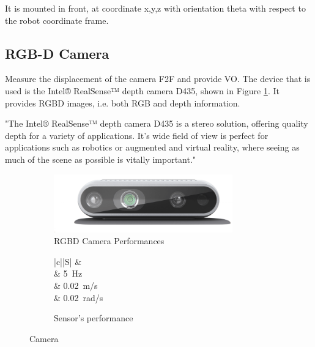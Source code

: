 It is mounted in front, at coordinate x,y,z with orientation theta with respect to the robot coordinate frame.

\subsection{RGB-D Camera}

\noindent Measure the displacement of the camera \gls{F2F} and provide \gls{VO}.
The device that is used is the Intel® RealSense™ depth camera D435, shown in Figure \ref{fig:d435}.
It provides \gls{RGBD} images, i.e. both \gls{RGB} and depth information.

"The Intel® RealSense™ depth camera D435 is a stereo solution, offering quality depth for a variety of applications. It's wide field of view is perfect for applications such as robotics or augmented and virtual reality, where seeing as much of the scene as possible is vitally important."

\begin{figure}[!ht]
	\begin{center}
		\begin{subfigure}[b]{.5\textwidth}
			\begin{center}
				\includegraphics[width=0.85\textwidth]{Images/4-Methods/d435i-1.png}
			\end{center}
			\caption{\gls{RGBD} Camera Performances}
			\label{fig:d435}
		\end{subfigure}
		\begin{subfigure}[b]{.45\textwidth}
			\begin{center}
				\label{tab:evalCamera}
				\begin{tabular}{|c||S|}
					\hline
					 &   \\
					\hline
					\hline
					 &  \SI{5}{Hz} \\
					\hline
					 & \SI{0.02}{\meter/\second} \\
					\hline
					\centering{$\boldsymbol \eta_{\omega}$} & \SI{0.02}{\radian/\second} \\
					\hline
				\end{tabular}
				\caption{Sensor's performance}
			\end{center}
		\end{subfigure}%
		\caption{Camera}
		\label{fig:camera_sensor}
	\end{center}
\end{figure}

